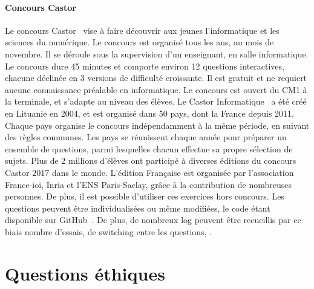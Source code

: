     \paragraph{Concours Castor}
        Le concours Castor~ vise à faire découvrir aux jeunes l'informatique et les sciences du numérique. Le concours est organisé tous les ans, au mois de novembre. Il se déroule sous la supervision d'un enseignant, en salle informatique. Le concours dure 45 minutes et comporte environ 12 questions interactives, chacune déclinée en 3 versions de difficulté croissante. Il est gratuit et ne requiert aucune connaissance préalable en informatique. Le concours est ouvert du CM1 à la terminale, et s'adapte au niveau des élèves.
        Le Castor Informatique~ a été créé en Lituanie en 2004, et est organisé dans 50 pays, dont la France depuis 2011. Chaque pays organise le concours indépendamment à la même période, en suivant des règles communes. Les pays se réunissent chaque année pour préparer un ensemble de questions, parmi lesquelles chacun effectue sa propre sélection de sujets. Plus de 2 millions d'élèves ont participé à diverses éditions du concours Castor 2017 dans le monde. L'édition Française est organisée par l'association France-ioi, Inria et l'ENS Paris-Saclay, grâce à la contribution de nombreuses personnes.
        De plus, il est possible d'utiliser ces exercices hors concours. Les questions peuvent être individualisées ou même modifiées, le code étant disponible sur GitHub~. De plus, de nombreux log peuvent être recueillis par ce biais \eg nombre d'essais, de switching entre les questions, \etc.
\section{Questions éthiques}\label{sec:adm}
